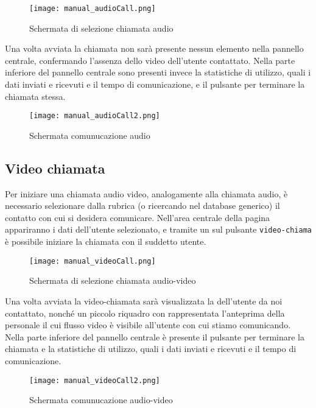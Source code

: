 \begin{figure}[H]
  \centering
  \texttt{[image: manual\_audioCall.png]}
\caption{Schermata di selezione chiamata audio}\label{fig:audioCall}
\end{figure}

Una volta avviata la chiamata non sarà presente nessun elemento nella pannello centrale, confermando l'assenza dello  video dell'utente contattato. 
Nella parte inferiore del pannello centrale sono presenti invece la statistiche di utilizzo, quali i dati inviati e ricevuti e il tempo di comunicazione, e il pulsante per terminare la chiamata stessa.

\begin{figure}[H]
  \centering
  \texttt{[image: manual\_audioCall2.png]}
\caption{Schermata comunucazione audio}\label{fig:audioCall2}
\end{figure}

\clearpage

\subsection{Video chiamata}
Per iniziare una chiamata audio video, analogamente alla chiamata audio, è necessario selezionare dalla rubrica (o ricercando nel database generico) il contatto con cui si desidera comunicare. Nell'area centrale della pagina appariranno i dati dell'utente selezionato, e tramite un  sul pulsante 
\texttt{video-chiama} è possibile iniziare la chiamata con il suddetto utente.

\begin{figure}[H]
  \centering
  \texttt{[image: manual\_videoCall.png]}
\caption{Schermata di selezione chiamata audio-video}\label{fig:videoCall}
\end{figure}

Una volta avviata la video-chiamata sarà visualizzata la  dell'utente da noi contattato, nonché un piccolo riquadro con rappresentata l'anteprima della  personale il cui flusso video è visibile all'utente con cui stiamo comunicando. 
Nella parte inferiore del pannello centrale è presente il pulsante per terminare la chiamata e la statistiche di utilizzo, quali i dati inviati e ricevuti e il tempo di comunicazione.

\begin{figure}[H]
  \centering
  \texttt{[image: manual\_videoCall2.png]}
\caption{Schermata comunucazione audio-video}\label{fig:videoCall2}
\end{figure}

